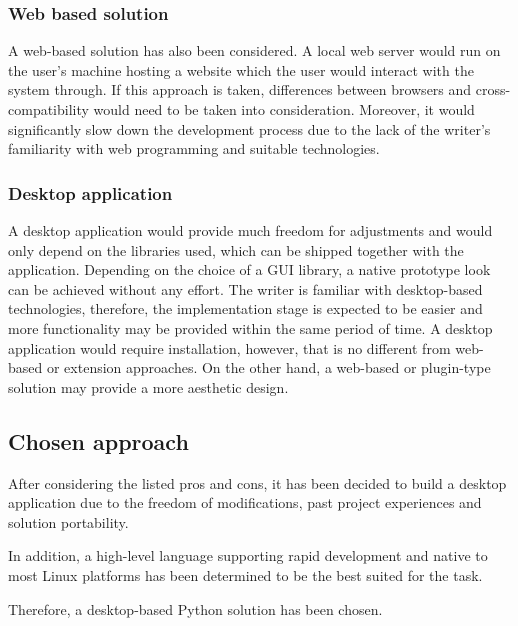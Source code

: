 	\subsubsection{Web based solution}
	A web-based solution has also been considered. A local web server would run on the user’s machine hosting a website which the user would interact with the system through. If this approach is taken, differences between browsers and cross-compatibility would need to be taken into consideration. Moreover, it would significantly slow down the development process due to the lack of the writer’s familiarity with web programming and suitable technologies.
	
	\subsubsection{Desktop application}
	A desktop application would provide much freedom for adjustments and would only depend on the libraries used, which can be shipped together with the application. Depending on the choice of a GUI library, a native prototype look can be achieved without any effort. The writer is familiar with desktop-based technologies, therefore, the implementation stage is expected to be easier and more functionality may be provided within the same period of time. A desktop application would require installation, however, that is no different from web-based or extension approaches. On the other hand, a web-based or plugin-type solution may provide a more aesthetic design.

\subsection{Chosen approach}
	After considering the listed pros and cons, it has been decided to build a desktop application due to the freedom of modifications, past project experiences and solution portability.
	
	In addition, a high-level language supporting rapid development and native to most Linux platforms has been determined to be the best suited for the task.
	
	Therefore, a desktop-based Python solution has been chosen.
